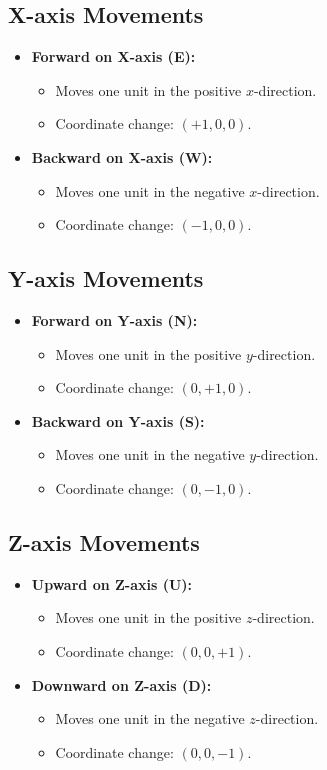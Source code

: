 \documentclass{article}
\begin{document}
\subsection*{X-axis Movements}
\begin{itemize}
    \item \textbf{Forward on X-axis (E):}
    \begin{itemize}
        \item Moves one unit in the positive $x$-direction.
        \item Coordinate change: $(+1, 0, 0)$.
    \end{itemize}
    \item \textbf{Backward on X-axis (W):}
    \begin{itemize}
        \item Moves one unit in the negative $x$-direction.
        \item Coordinate change: $(-1, 0, 0)$.
    \end{itemize}
\end{itemize}

\subsection*{Y-axis Movements}
\begin{itemize}
    \item \textbf{Forward on Y-axis (N):}
    \begin{itemize}
        \item Moves one unit in the positive $y$-direction.
        \item Coordinate change: $(0, +1, 0)$.
    \end{itemize}
    \item \textbf{Backward on Y-axis (S):}
    \begin{itemize}
        \item Moves one unit in the negative $y$-direction.
        \item Coordinate change: $(0, -1, 0)$.
    \end{itemize}
\end{itemize}

\subsection*{Z-axis Movements}
\begin{itemize}
    \item \textbf{Upward on Z-axis (U):}
    \begin{itemize}
        \item Moves one unit in the positive $z$-direction.
        \item Coordinate change: $(0, 0, +1)$.
    \end{itemize}
    \item \textbf{Downward on Z-axis (D):}
    \begin{itemize}
        \item Moves one unit in the negative $z$-direction.
        \item Coordinate change: $(0, 0, -1)$.
    \end{itemize}

\end{itemize}
\end{document}
